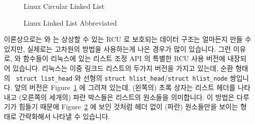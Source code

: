 \begin{figure}[tb]
\begin{center}
\end{center}
\caption{Linux Circular Linked List}
\label{fig:defer:Linux Circular Linked List}
\end{figure}

\begin{figure}[tb]
\begin{center}
\end{center}
\caption{Linux Linked List Abbreviated}
\label{fig:defer:Linux Linked List Abbreviated}
\end{figure}

이론상으로는  와  는 상상할 수
있는 RCU 로 보호되는 데이터 구조는 얼마든지 만들 수 있지만, 실제로는
고차원의 방법을 사용하는게 나은 경우가 많이 있습니다.
그런 이유로,  와  함수들이
리눅스에 있는 리스트 조정 API 의 특별한 RCU 사용 버전에 내장되어 있습니다.
리눅스는 이중 링크드 리스트의 두가지 버전을 가지고 있는데, 순환 형태의 {\tt
struct list\_head} 와 선형의 {\tt struct hlist\_head}/{\tt struct hlist\_node}
쌍입니다.
앞의 버전은
Figure~\ref{fig:defer:Linux Circular Linked List} 에 그려져 있는데, (왼쪽의)
초록 상자는 리스트 헤더를 나타내고 (오른쪽의 세개의) 파란 박스들은 리스트의
원소들을 의미합니다.
이 방법은 다루기가 힘들기 때문에
Figure~\ref{fig:defer:Linux Linked List Abbreviated} 에 보인 것처럼 헤더 없이
(파란) 원소들만을 보이는 형태로 간략화해서 나타낼 수 있습니다.

